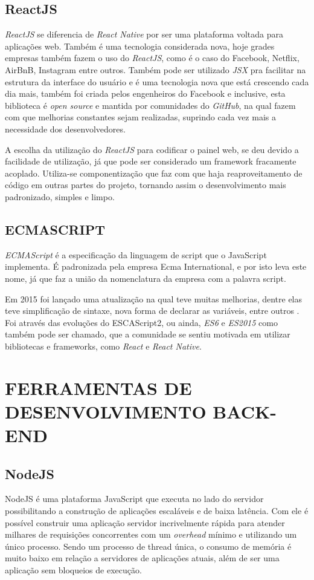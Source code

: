 \subsection{ReactJS}
\textit{ReactJS} se diferencia de \textit{React Native} por ser uma plataforma voltada para aplicações web. Também é uma tecnologia considerada nova, hoje grades empresas também fazem o uso do \textit{ReactJS}, como é o caso do Facebook, Netflix, AirBnB, Instagram entre outros. Também pode ser utilizado \textit{JSX} pra facilitar na estrutura da interface do usuário e é uma tecnologia nova que está crescendo cada dia mais, também foi criada pelos engenheiros do Facebook e inclusive, esta biblioteca é \textit{open source} e mantida por comunidades do \textit{GitHub}, na qual fazem com que melhorias constantes sejam realizadas, suprindo cada vez mais a necessidade dos desenvolvedores.

A escolha da utilização do \textit{ReactJS} para codificar o painel web, se deu devido a facilidade de utilização, já que pode ser considerado um framework fracamente acoplado. Utiliza-se componentização que faz com que haja reaproveitamento de código em outras partes do projeto, tornando assim o desenvolvimento mais padronizado, simples e limpo.



\subsection{ECMASCRIPT}

\textit{ECMAScript} é a especificação da linguagem de script que o JavaScript implementa. É padronizada pela empresa Ecma International, e por isto leva este nome, já que faz a união da nomenclatura da empresa com a palavra script. 

Em 2015 foi lançado uma atualização na qual teve muitas melhorias, dentre elas teve simplificação de sintaxe, nova forma de declarar as variáveis, entre outros \cite{ecma}.
Foi através das evoluções do ESCAScript2, ou ainda, \textit{ES6} e \textit{ES2015} como também pode ser chamado, que a comunidade se sentiu motivada em utilizar bibliotecas e frameworks, como \textit{React} e \textit{React Native}. 

\section{FERRAMENTAS DE DESENVOLVIMENTO BACK-END}

\subsection{NodeJS}
NodeJS é uma plataforma JavaScript que executa no lado do servidor possibilitando a construção de aplicações escaláveis e de baixa latência. Com ele é possível construir uma aplicação servidor incrivelmente rápida para atender milhares de requisições concorrentes com um \textit{overhead} mínimo e utilizando um único processo. Sendo um processo de thread única, o consumo de memória é muito baixo em relação a servidores de aplicações atuais, além de ser uma aplicação sem bloqueios de execução. \cite{node}

